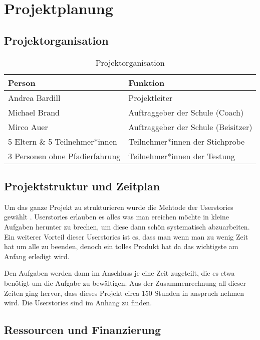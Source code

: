 
\chapter{Projektplanung}

\section{Projektorganisation}
\begin{center}
\begin{table}[h]
\begin{tabularx}{\textwidth}{X|X}
    \textbf{Person} & \textbf{Funktion} \\ \hline
    Andrea Bardill & Projektleiter \\
    Michael Brand & Auftraggeber der Schule (Coach) \\
    Mirco Auer & Auftraggeber der Schule (Beisitzer) \\
    5 Eltern \& 5 Teilnehmer*innen & Teilnehmer*innen der Stichprobe \\
    3 Personen ohne Pfadierfahrung & Teilnehmer*innen der Testung
\end{tabularx}
\caption{Projektorganisation}
\end{table}
\end{center}

\section{Projektstruktur und Zeitplan}
Um das ganze Projekt zu strukturieren wurde die Mehtode der Userstories gewählt \cite{userstories}. Userstories erlauben es alles was man ereichen möchte in kleine Aufgaben herunter zu brechen, um diese dann schön systematisch abzuarbeiten. Ein weiterer Vorteil dieser Userstories ist es, dass man wenn man zu wenig Zeit hat um alle zu beenden, denoch ein tolles Produkt hat da das wichtigste am Anfang erledigt wird. \par Den Aufgaben werden dann im Anschluss je eine Zeit zugeteilt, die es etwa benötigt um die Aufgabe zu bewältigen. Aus der Zusammenrechnung all dieser Zeiten ging hervor, dass dieses Projekt circa 150 Stunden in anspruch nehmen wird. Die Userstories sind im Anhang zu finden.
\newpage
\section{Ressourcen und Finanzierung}

